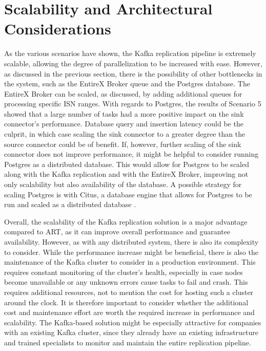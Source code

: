 \section{Scalability and Architectural Considerations}
As the various scenarios have shown, the Kafka replication pipeline is extremely scalable, allowing the degree of parallelization to be increased with ease. However, as discussed in the previous section, there is the possibility of other bottlenecks in the system, such as the EntireX Broker queue and the Postgres database. The EntireX Broker can be scaled, as discussed, by adding additional queues for processing specific \ac{ISN} ranges. With regards to Postgres, the results of Scenario 5 showed that a large number of tasks had a more positive impact on the sink connector's performance. Database query and insertion latency could be the culprit, in which case scaling the sink connector to a greater degree than the source connector could be of benefit. If, however, further scaling of the sink connector does not improve performance, it might be helpful to consider running Postgres as a distributed database. This would allow for Postgres to be scaled along with the Kafka replication and with the EntireX Broker, improving not only scalability but also availability of the database. A possible strategy for scaling Postgres is with Citus, a database engine that allows for Postgres to be run and scaled as a distributed database \cite{cubukcu2021citus}.

Overall, the scalability of the Kafka replication solution is a major advantage compared to \ac{ART}, as it can improve overall performance and guarantee availability. However, as with any distributed system, there is also its complexity to consider. While the performance increase might be beneficial, there is also the maintenance of the Kafka cluster to consider in a production environment. This requires constant monitoring of the cluster's health, especially in case nodes become unavailable or any unknown errors cause tasks to fail and crash. This requires additional resources, not to mention the cost for hosting such a cluster around the clock. It is therefore important to consider whether the additional cost and maintenance effort are worth the required increase in performance and scalability. The Kafka-based solution might be especially attractive for companies with an existing Kafka cluster, since they already have an existing infrastructure and trained specialists to monitor and maintain the entire replication pipeline.

